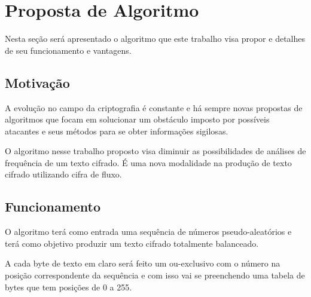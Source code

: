 \chapter{Proposta de Algoritmo}
\label{algorithm-proposition}

Nesta seção será apresentado o algoritmo que este trabalho visa propor e detalhes de seu funcionamento e vantagens.

\section{Motivação}
\label{motivation}

A evolução no campo da criptografia é constante e há sempre novas propostas de algoritmos que focam em solucionar um obstáculo imposto por possíveis atacantes e seus métodos para se obter informações sigilosas.

O algoritmo nesse trabalho proposto visa diminuir as possibilidades de análises de frequência de um texto cifrado. É uma nova modalidade na produção de texto cifrado utilizando cifra de fluxo. 


\section{Funcionamento}
\label{functioning}

O algoritmo terá como entrada uma sequência de números pseudo-aleatórios e terá como objetivo produzir um texto cifrado totalmente balanceado.

A cada byte de texto em claro será feito um ou-exclusivo com o número na posição correspondente da sequência e com isso vai se preenchendo uma tabela de bytes que tem posições de 0 a 255.

